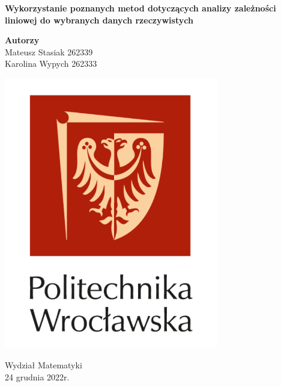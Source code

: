 \documentclass{article}
\begin{document}
\begin{titlepage}
   \begin{center}
   
       \textbf{\huge Wykorzystanie poznanych metod dotyczących analizy zależności liniowej do wybranych danych rzeczywistych}

       \vspace{1cm}
            
       \textbf{\Large Autorzy}\\
       \vspace{0.5cm}
       Mateusz Stasiak 262339\\
       Karolina Wypych 262333\\
            
       \vspace{1cm}
     
       \includegraphics[width=0.7\textwidth]{images/logo_pwr.png}
       
       \vspace{0.8cm}
       Wydział Matematyki\\
       24 grudnia 2022r.
            
   \end{center}
\end{titlepage}
\tableofcontents
\newpage
\end{document}
